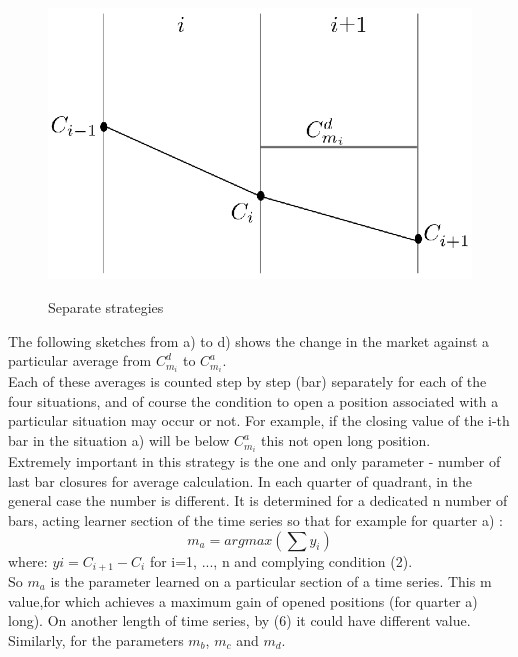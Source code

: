 \documentclass{tewiart}
\begin{document}
\begin{figure}[h]
\begin{minipage}{.49\linewidth}
\label{cztero}
\end{minipage}
\begin{minipage}{.49\linewidth}
\centering 
\includegraphics[width=\textwidth]{rysunek2d.eps}
\label{mansard}
\end{minipage}
\caption{Separate strategies}
\end{figure}
\FloatBarrier
\indent The following sketches from a) to d) shows the change in the market against a particular average from $C^d_{m_{i}}$ to $C^a_{m_{i}}$.\\
\indent Each of these averages is counted step by step (bar) separately for each of the four situations, and of course the condition to open a position associated with a particular situation may occur or not. For example, if the closing value of the i-th bar in the situation a) will be below $C^a_{m_{i}}$ this not open long position.\\
\indent Extremely important in this strategy is the one and only parameter - number of last bar closures for average calculation. In each quarter of quadrant, in the general case the number is different. It is determined for a dedicated n number of bars, acting learner section of the time series so that for example for quarter a) :\\
\begin{equation}
	m_a = argmax (\sum y_i  )
\end{equation}
where: $yi = C_{i+1} - C_{i}$ for i=1, ..., n and complying  condition (2).\\
\indent So $m_{a}$ is the parameter learned on a particular section of a time series. This m value,for which achieves a maximum gain of opened positions (for quarter a) long). On another length of time series, by (6) it could have different value. Similarly, for the parameters $m_{b}$, $m_{c}$ and $m_{d}$.\\
\end{document}
